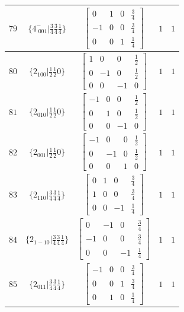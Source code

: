\documentclass[fleqn,8pt]{jsarticle}
\begin{document}
\begin{longtable}{ccccc}
$ 79 $ & $ \{4^{-}_{\,\,001}|\frac{3}{4} \frac{3}{4} \frac{1}{4}\} $ & $ \begin{bmatrix} 0 & 1 & 0 & \frac{3}{4} \\ -1 & 0 & 0 & \frac{3}{4} \\ 0 & 0 & 1 & \frac{1}{4} \end{bmatrix} $ & $ 1 $ & $ 1 $ \\ \hline
$ 80 $ & $ \{2{}_{100}|\frac{1}{2} \frac{1}{2} 0\} $ & $ \begin{bmatrix} 1 & 0 & 0 & \frac{1}{2} \\ 0 & -1 & 0 & \frac{1}{2} \\ 0 & 0 & -1 & 0 \end{bmatrix} $ & $ 1 $ & $ 1 $ \\ \hline
$ 81 $ & $ \{2{}_{010}|\frac{1}{2} \frac{1}{2} 0\} $ & $ \begin{bmatrix} -1 & 0 & 0 & \frac{1}{2} \\ 0 & 1 & 0 & \frac{1}{2} \\ 0 & 0 & -1 & 0 \end{bmatrix} $ & $ 1 $ & $ 1 $ \\ \hline
$ 82 $ & $ \{2{}_{001}|\frac{1}{2} \frac{1}{2} 0\} $ & $ \begin{bmatrix} -1 & 0 & 0 & \frac{1}{2} \\ 0 & -1 & 0 & \frac{1}{2} \\ 0 & 0 & 1 & 0 \end{bmatrix} $ & $ 1 $ & $ 1 $ \\ \hline
$ 83 $ & $ \{2{}_{110}|\frac{3}{4} \frac{3}{4} \frac{1}{4}\} $ & $ \begin{bmatrix} 0 & 1 & 0 & \frac{3}{4} \\ 1 & 0 & 0 & \frac{3}{4} \\ 0 & 0 & -1 & \frac{1}{4} \end{bmatrix} $ & $ 1 $ & $ 1 $ \\ \hline
$ 84 $ & $ \{2{}_{1-10}|\frac{3}{4} \frac{3}{4} \frac{1}{4}\} $ & $ \begin{bmatrix} 0 & -1 & 0 & \frac{3}{4} \\ -1 & 0 & 0 & \frac{3}{4} \\ 0 & 0 & -1 & \frac{1}{4} \end{bmatrix} $ & $ 1 $ & $ 1 $ \\ \hline
$ 85 $ & $ \{2{}_{011}|\frac{3}{4} \frac{3}{4} \frac{1}{4}\} $ & $ \begin{bmatrix} -1 & 0 & 0 & \frac{3}{4} \\ 0 & 0 & 1 & \frac{3}{4} \\ 0 & 1 & 0 & \frac{1}{4} \end{bmatrix} $ & $ 1 $ & $ 1 $ \\ \hline

\end{longtable}
\end{document}
